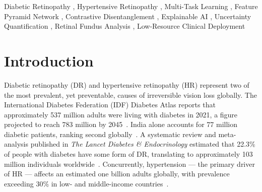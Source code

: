 \documentclass[review,12pt]{elsarticle}
\newcommand{\RESULT}[1]{\textbf{[--]}}
\begin{document}
\begin{frontmatter}
\begin{abstract}
The complete system, IRDAS (Integrated Retinal Disease Analysis System),
integrates a XGBoost-based pre-screening triage module using six electronic
health record variables and a multilingual patient report generator supporting
nine Indic languages. Experiments on APTOS 2019, HRDC 2023, IDRiD, and DRIVE
datasets demonstrate a DR quadratic weighted kappa of \RESULT{dr_qwk_full}
on APTOS validation, cross-dataset generalisation kappa of
\RESULT{dr_qwk_idrid} on IDRiD, HR AUC of \RESULT{hr_auc_full}, and
expected calibration error of \RESULT{ece_full}. Ablation studies confirm
the independent contribution of each architectural component.
\end{abstract}

\begin{keyword}
Diabetic Retinopathy \sep
Hypertensive Retinopathy \sep
Multi-Task Learning \sep
Feature Pyramid Network \sep
Contrastive Disentanglement \sep
Explainable AI \sep
Uncertainty Quantification \sep
Retinal Fundus Analysis \sep
Low-Resource Clinical Deployment
\end{keyword}

\end{frontmatter}

\section{Introduction}
\label{sec:intro}

Diabetic retinopathy (DR) and hypertensive retinopathy (HR) represent two
of the most prevalent, yet preventable, causes of irreversible vision loss
globally. The International Diabetes Federation (IDF) Diabetes Atlas reports
that approximately 537 million adults were living with diabetes in 2021, a
figure projected to reach 783 million by 2045~\cite{idf2021}. India alone
accounts for 77 million diabetic patients, ranking second globally~\cite{idf2021}.
A systematic review and meta-analysis published in \textit{The Lancet Diabetes
\& Endocrinology} estimated that 22.3\% of people with diabetes have some form
of DR, translating to approximately 103 million individuals
worldwide~\cite{teo2023}. Concurrently, hypertension — the primary driver of
HR — affects an estimated one billion adults globally, with prevalence exceeding
30\% in low- and middle-income countries~\cite{who2023hypertension}.
\end{document}
